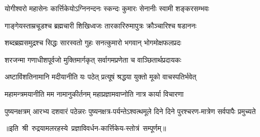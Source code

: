 

\twolineshloka
{योगीश्वरो महासेनः कार्त्तिकेयोऽग्निनन्दनः}
{स्कन्दः कुमारः सेनानीः स्वामी शङ्करसम्भवः}

\twolineshloka
{गाङ्गेयस्ताम्रचूडश्च ब्रह्मचारी शिखिध्वजः}
{तारकारिरुमापुत्रः क्रौञ्चारिश्च षडाननः}

\twolineshloka
{शब्दब्रह्मसमुद्रश्च सिद्धः सारस्वतो गुहः}
{सनत्कुमारो भगवान् भोगमोक्षफलप्रदः}

\twolineshloka
{शरजन्मा गणाधीशपूर्वजो मुक्तिमार्गकृत्}
{सर्वागमप्रणेता च वाञ्छितार्थप्रदायकः}

\twolineshloka
{अष्टाविंशतिनामानि मदीयानीति यः पठेत्}
{प्रत्यूषं श्रद्धया युक्तो मूको वाचस्पतिर्भवेत्}

\twolineshloka
{महामन्त्रमयानीति मम नामानुकीर्तनम्}
{महाप्रज्ञामवाप्नोति नात्र कार्या विचारणा}

\threelineshloka
{पुष्यनक्षत्रम् आरभ्य दशवारं पठेन्नरः}
{पुष्यनक्षत्र-पर्यन्तेऽश्वत्थमूले दिने दिने}
{पुरश्चरण-मात्रेण सर्वपापैः प्रमुच्यते}

॥इति~श्री~रुद्रयामलरहस्ये~प्रज्ञाविवर्धन-कार्त्तिकेय-स्तोत्रं~सम्पूर्णम्॥
